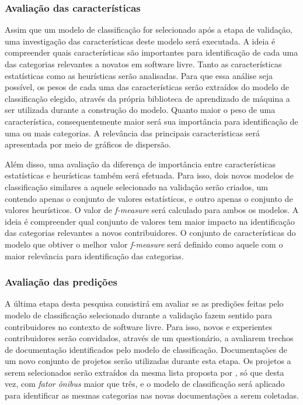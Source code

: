 \subsubsection{Avaliação das características}
Assim que um modelo de classificação for selecionado após a etapa de validação, uma investigação  das características deste modelo será executada. A ideia é compreender quais características são importantes para identificação de cada uma das categorias relevantes a novatos em software livre. Tanto as características estatísticas como as heurísticas serão analisadas. Para que essa análise seja possível, os pesos de cada uma das características serão extraídos do modelo de classificação elegido, através da própria biblioteca de aprendizado de máquina a ser utilizada durante a construção do modelo. Quanto maior o peso de uma característica, consequentemente maior será sua importância para identificação de uma ou mais categorias. A relevância das principais características será apresentada por meio de gráficos de dispersão. 

Além disso, uma avaliação da diferença de importância entre características estatísticas e heurísticas também será efetuada. Para isso, dois novos modelos de classificação similares a aquele selecionado na validação serão criados, um contendo apenas o conjunto de valores estatísticos, e outro apenas o conjunto de valores heurísticos. O valor de \textit{f-measure} será calculado para ambos os modelos. A ideia é compreender qual conjunto de valores tem maior impacto na identificação das categorias relevantes a novos contribuidores. O conjunto de características do modelo que obtiver o melhor valor \textit{f-measure} será definido como aquele com o maior relevância para identificação das categorias.

\subsubsection{Avaliação das predições}

A última etapa desta pesquisa consistirá em avaliar se as predições feitas pelo modelo de classificação selecionado durante a validação fazem sentido para contribuidores no contexto de software livre. Para isso, novos e experientes contribuidores serão convidados, através de um questionário, a avaliarem trechos de documentação identificados pelo modelo de classificação. Documentações de um novo conjunto de projetos serão utilizadas durante esta etapa. Os projetos a serem selecionados serão extraídos da mesma lista proposta por \citet{avelino2015truck}, só que desta vez, com \textit{fator ônibus} maior que três, e o modelo de classificação será aplicado para identificar as mesmas categorias nas novas documentações a serem coletadas.

